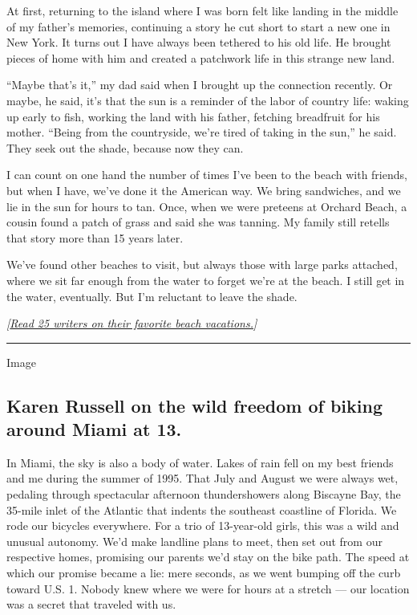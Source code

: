 At first, returning to the island where I was born felt like landing in
the middle of my father's memories, continuing a story he cut short to
start a new one in New York. It turns out I have always been tethered to
his old life. He brought pieces of home with him and created a patchwork
life in this strange new land.

``Maybe that's it,'' my dad said when I brought up the connection
recently. Or maybe, he said, it's that the sun is a reminder of the
labor of country life: waking up early to fish, working the land with
his father, fetching breadfruit for his mother. ``Being from the
countryside, we're tired of taking in the sun,'' he said. They seek out
the shade, because now they can.

I can count on one hand the number of times I've been to the beach with
friends, but when I have, we've done it the American way. We bring
sandwiches, and we lie in the sun for hours to tan. Once, when we were
preteens at Orchard Beach, a cousin found a patch of grass and said she
was tanning. My family still retells that story more than 15 years
later.

We've found other beaches to visit, but always those with large parks
attached, where we sit far enough from the water to forget we're at the
beach. I still get in the water, eventually. But I'm reluctant to leave
the shade.

\emph{{[}}\href{https://www.nytimes3xbfgragh.onion/2019/05/31/travel/25-writers-on-their-favorite-beach-vacations.html}{\emph{Read
25 writers on their favorite beach vacations.}}\emph{{]}}

\begin{center}\rule{0.5\linewidth}{\linethickness}\end{center}

Image

\hypertarget{karen-russell-on-the-wild-freedom-of-biking-around-miami-at-13}{%
\subsection{Karen Russell on the wild freedom of biking around Miami at
13.}\label{karen-russell-on-the-wild-freedom-of-biking-around-miami-at-13}}

In Miami, the sky is also a body of water. Lakes of rain fell on my best
friends and me during the summer of 1995. That July and August we were
always wet, pedaling through spectacular afternoon thundershowers along
Biscayne Bay, the 35-mile inlet of the Atlantic that indents the
southeast coastline of Florida. We rode our bicycles everywhere. For a
trio of 13-year-old girls, this was a wild and unusual autonomy. We'd
make landline plans to meet, then set out from our respective homes,
promising our parents we'd stay on the bike path. The speed at which our
promise became a lie: mere seconds, as we went bumping off the curb
toward U.S. 1. Nobody knew where we were for hours at a stretch --- our
location was a secret that traveled with us.

